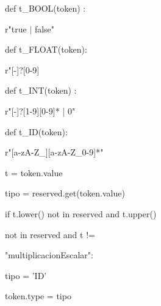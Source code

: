    
\begin{multicols}{2}   

def t\_BOOL(token) : 

\hspace{5mm}    r"true $|$ false"
    
    
def t\_FLOAT(token):

\hspace{5mm}    r"[-]?[0-9] 
    
def t\_INT(token) : 

\hspace{5mm}    r"[-]?[1-9][0-9]* | 0"
    
\columnbreak

def t\_ID(token):

\hspace{5mm}r"[a-zA-Z\_][a-zA-Z\_0-9]*"

\hspace{5mm}t = token.value
    
\hspace{5mm}tipo = reserved.get(token.value) 

\hspace{5mm}if t.lower() not in reserved and t.upper() 

\hspace{5mm}not in reserved and t != 

\hspace{5mm}"multiplicacionEscalar":

\hspace{10mm}tipo = 'ID'

\hspace{5mm}token.type = tipo
  
\end{multicols}


